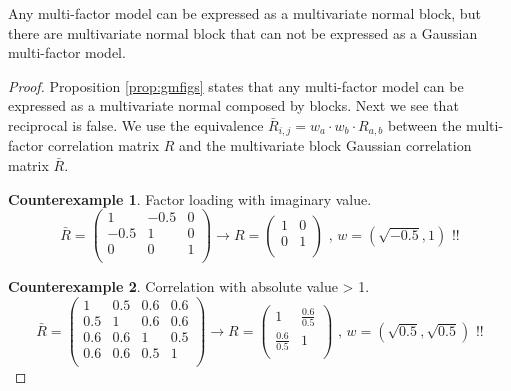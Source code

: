 \documentclass[11pt,fleqn]{book} %
\begin{document}
\begin{proposition}
	Any multi-factor model can be expressed as a multivariate normal 
	block, but there are multivariate normal block that can not be 
	expressed as a Gaussian multi-factor model.
\end{proposition}
\begin{proof}
	Proposition \ref{prop:gmfigs} states that any multi-factor model 
	can be expressed as a multivariate normal composed by blocks.
	Next we see that reciprocal is false. We use the equivalence 
	$\bar{R}_{i,j} = w_a \cdot w_b \cdot R_{a,b}$ between
	the multi-factor correlation matrix $R$ and the multivariate block
	Gaussian correlation matrix $\bar{R}$.
	
	\textbf{Counterexample 1}. Factor loading with imaginary value.
	\begin{displaymath}
		\bar{R} = \left(
		\begin{array}{cc|c}
			1    & -0.5 & 0 \\
			-0.5 & 1    & 0 \\
			\hline
			0    & 0    & 1 \\
		\end{array}
		\right) 
		\longrightarrow
		R = \left(
		\begin{array}{cc}
			1 & 0 \\
			0 & 1 \\
		\end{array}
		\right)
		\text{ , }
		w = (\sqrt{-0.5}, 1)
		\text{ !!}
	\end{displaymath}
	
	\textbf{Counterexample 2}. Correlation with absolute value > 1.
	\begin{displaymath}
		\bar{R} = \left(
		\begin{array}{cc|cc}
			1   & 0.5 & 0.6 & 0.6 \\
			0.5 & 1   & 0.6 & 0.6 \\
			\hline
			0.6 & 0.6 & 1   & 0.5 \\
			0.6 & 0.6 & 0.5 & 1   \\
		\end{array}
		\right) 
		\longrightarrow
		R = \left(
		\begin{array}{cc}
			1               & \frac{0.6}{0.5} \\
			\frac{0.6}{0.5} & 1               \\
		\end{array}
		\right)
		\text{ , }
		w = (\sqrt{0.5}, \sqrt{0.5})
		\text{ !!}
	\end{displaymath}
\end{proof}
\end{document}

